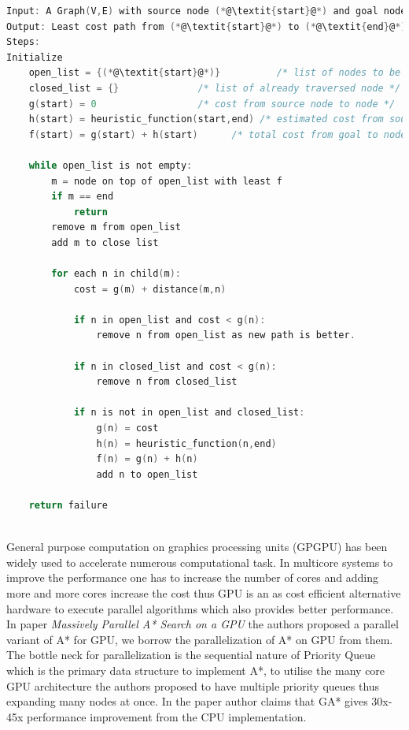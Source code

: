 \documentclass[a4paper]{article}
\begin{document}
\begin{lstlisting}[language=C , caption=A*\cite{A*} ]
Input: A Graph(V,E) with source node (*@\textit{start}@*) and goal node (*@\textit{end}@*).
Output: Least cost path from (*@\textit{start}@*) to (*@\textit{end}@*).
Steps:
Initialize 
    open_list = {(*@\textit{start}@*)}          /* list of nodes to be traversed */
    closed_list = {}              /* list of already traversed node */
    g(start) = 0                  /* cost from source node to node */
    h(start) = heuristic_function(start,end) /* estimated cost from source to goal node */
    f(start) = g(start) + h(start)      /* total cost from goal to node */
    
    while open_list is not empty:
        m = node on top of open_list with least f
        if m == end
            return
        remove m from open_list
        add m to close list
        
        for each n in child(m):
            cost = g(m) + distance(m,n)
            
            if n in open_list and cost < g(n):
                remove n from open_list as new path is better.
                
            if n in closed_list and cost < g(n):
                remove n from closed_list
                
            if n is not in open_list and closed_list:
                g(n) = cost
                h(n) = heuristic_function(n,end)
                f(n) = g(n) + h(n)
                add n to open_list
    
    return failure
    
\end{lstlisting}
General purpose computation on graphics processing units (GPGPU) has been widely used to accelerate numerous computational task. In multicore systems to improve the performance one has to increase the number of cores and adding more and more cores increase the cost thus GPU is an as cost efficient alternative hardware to execute parallel algorithms which also provides better performance. In paper \textit{Massively Parallel A* Search on a GPU}\cite{GA*} the authors proposed a parallel variant of A* for GPU, we borrow the parallelization of A* on GPU from them. The bottle neck for parallelization is the sequential nature of Priority Queue which is the primary data structure to implement A*, to utilise the many core GPU architecture the authors proposed to have multiple priority queues thus expanding many nodes at once. In the paper author claims that GA* gives 30x-45x performance improvement from the CPU implementation.
\end{document}
